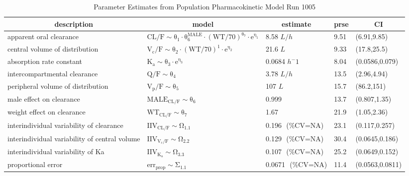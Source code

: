 \begin{table}[ht]
 \caption[Model 1005 Parameters]{Parameter Estimates from Population Pharmacokinetic Model Run 1005\label{p1005}} 
 \begin{center}
 \begin{tabular}{lllll}\hline\hline
\multicolumn{1}{c}{description}&\multicolumn{1}{c}{model}&\multicolumn{1}{c}{estimate}&\multicolumn{1}{c}{prse}&\multicolumn{1}{c}{CI}\tabularnewline
\hline
apparent oral clearance&$\mathrm{CL/F  \sim \theta_{1}\cdot  \theta_{6}^{MALE}\cdot (WT/70)^{\theta_{7}}\cdot e^{\eta_{1}}}$&8.58 $ L/h $&9.51&(6.91,9.85)\tabularnewline
central volume of distribution&$\mathrm{V_{c}/F  \sim \theta_{2}\cdot (WT/70)^{1}\cdot e^{\eta_{2}}}$&21.6 $ L $&9.33&(17.8,25.5)\tabularnewline
absorption rate constant&$\mathrm{K_{a} \sim \theta_{3}\cdot e^{\eta_{3}}}$&0.0684 $ h^-1  $&8.04&(0.0586,0.079)\tabularnewline
intercompartmental clearance&$\mathrm{Q/F  \sim \theta_{4}}$&3.78 $ L/h $&13.5&(2.96,4.94)\tabularnewline
peripheral volume of distribution&$\mathrm{V_{p}/F  \sim \theta_{5}}$&107 $ L $&15.7&(86.2,151)\tabularnewline
male effect on clearance&$\mathrm{MALE_{CL/F}\sim \theta_{6}}$&0.999 $  $&13.7&(0.807,1.35)\tabularnewline
weight effect on clearance&$\mathrm{WT_{CL/F}\sim \theta_{7}}$&1.67 $  $&21.9&(1.05,2.36)\tabularnewline
interindividual variability of clearance&$\mathrm{IIV_{CL/F}\sim \Omega_{1.1}}$&0.196 $  $ (\%CV=NA)&23.1&(0.117,0.257)\tabularnewline
interindividual variability of central volume&$\mathrm{IIV_{V_{c}/F}\sim \Omega_{2.2}}$&0.129 $  $ (\%CV=NA)&30.4&(0.0645,0.186)\tabularnewline
interindividual variability of Ka&$\mathrm{IIV_{K_{a}}\sim \Omega_{3.3}}$&0.107 $  $ (\%CV=NA)&25.2&(0.0649,0.152)\tabularnewline
proportional error&$\mathrm{err_{prop}\sim \Sigma_{1.1}}$&0.0671 $  $ (\%CV=NA)&11.4&(0.0563,0.0811)\tabularnewline
\hline
\end{tabular}

\end{center}

\end{table}
